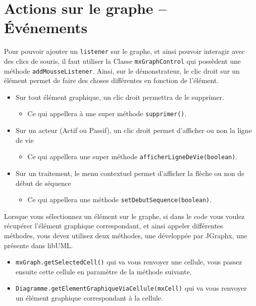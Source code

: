 \documentclass[12pt,a4paper,openany]{book}
\begin{document}
	\section{Actions sur le graphe -- Événements}
	Pour pouvoir ajouter un \texttt{listener} sur le graphe, et ainsi pouvoir interagir avec des clics de souris, 
	il faut utiliser la Classe \texttt{mxGraphControl} qui possèdent une méthode \texttt{addMousseListener}.
	Ainsi, sur le démonstrateur, le clic droit sur un élément permet de faire des choses différentes en fonction de l'élément. \\
	\begin{itemize}
		\item Sur tout élément graphique, un clic droit permettra de le supprimer.
			\begin{itemize}
				\item Ce qui appellera à une super méthode \texttt{supprimer()}.
			\end{itemize}
		\item Sur un acteur (Actif ou Passif), un clic droit permet d'afficher ou non la ligne de vie
			\begin{itemize}
				\item Ce qui appellera une super méthode \texttt{afficherLigneDeVie(boolean)}.
			\end{itemize}
		\item Sur un traitement, le menu contextuel permet d'afficher la flèche ou non de début de séquence
			\begin{itemize}
				\item Ce qui appellera une méthode \texttt{setDebutSequence(boolean)}.
			\end{itemize}
	\end{itemize}

	Lorsque vous sélectionnez un élément sur le graphe, si dans le code vous voulez récupérer l'élément graphique correspondant, 
	et ainsi appeler différentes méthodes, vous devez utilisez deux méthodes, une développée par JGraphx, une présente dans libUML. 
	\begin{itemize}
		\item \texttt{mxGraph.getSelectedCell()} qui va vous renvoyer une cellule, vous passez ensuite cette cellule en paramètre de la méthode suivante.
		\item \texttt{Diagramme.getElementGraphiqueViaCellule(mxCell)} qui va vous renvoyer un élément graphique correspondant à la cellule.
	\end{itemize}
	
\end{document}
